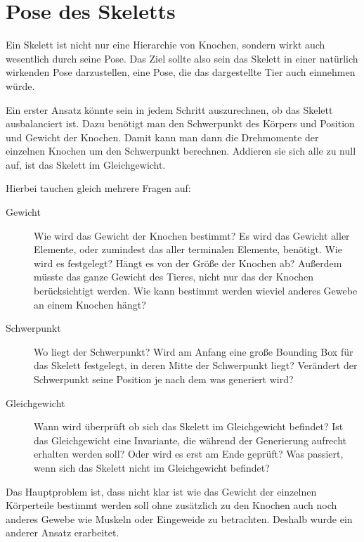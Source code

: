  

\section{Pose des Skeletts}

Ein Skelett ist nicht nur eine Hierarchie von Knochen, sondern wirkt auch wesentlich durch seine Pose. Das Ziel sollte also sein das Skelett in einer natürlich wirkenden Pose darzustellen, eine Pose, die das dargestellte Tier auch einnehmen würde.

Ein erster Ansatz könnte sein in jedem Schritt auszurechnen, ob das Skelett ausbalanciert ist. Dazu benötigt man den Schwerpunkt des Körpers und Position und Gewicht der Knochen.
Damit kann man dann die Drehmomente der einzelnen Knochen um den Schwerpunkt berechnen. Addieren sie sich alle zu null auf, ist das Skelett im Gleichgewicht.

Hierbei tauchen gleich mehrere Fragen auf:
\begin{description}
 \item[Gewicht] Wie wird das Gewicht der Knochen bestimmt? Es wird das Gewicht aller Elemente, oder zumindest das aller terminalen Elemente, benötigt. Wie wird es festgelegt? Hängt es von der Größe der Knochen ab? Außerdem müsste das ganze Gewicht des Tieres, nicht nur das der Knochen berücksichtigt werden. Wie kann bestimmt werden wieviel anderes Gewebe an einem Knochen hängt?
 
 \item[Schwerpunkt] Wo liegt der Schwerpunkt? Wird am Anfang eine große Bounding Box für das Skelett festgelegt, in deren Mitte der Schwerpunkt liegt? Verändert der Schwerpunkt seine Position je nach dem was generiert wird?
 
 \item[Gleichgewicht] Wann wird überprüft ob sich das Skelett im Gleichgewicht befindet? Ist das Gleichgewicht eine Invariante, die während der Generierung aufrecht erhalten werden soll? Oder wird es erst am Ende geprüft? Was passiert, wenn sich das Skelett nicht im Gleichgewicht befindet?
\end{description}
 
Das Hauptproblem ist, dass nicht klar ist wie das Gewicht der einzelnen Körperteile bestimmt werden soll ohne zusätzlich zu den Knochen auch noch anderes Gewebe wie Muskeln oder Eingeweide zu betrachten. Deshalb wurde ein anderer Ansatz erarbeitet.
 
